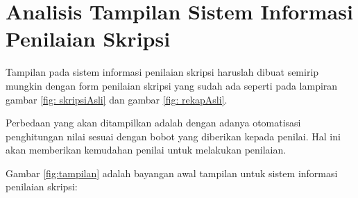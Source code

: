 \section{Analisis Tampilan Sistem Informasi Penilaian Skripsi}
\label{sec: analisisTampilan}
	
	Tampilan pada sistem informasi penilaian skripsi haruslah dibuat semirip mungkin dengan form penilaian skripsi yang sudah ada seperti pada lampiran gambar \ref{fig: skripsiAsli} dan gambar \ref{fig: rekapAsli}.
	
	Perbedaan yang akan ditampilkan adalah dengan adanya otomatisasi penghitungan nilai sesuai dengan bobot yang diberikan kepada penilai. Hal ini akan memberikan kemudahan penilai untuk melakukan penilaian.
	
	Gambar \ref{fig:tampilan} adalah bayangan awal tampilan untuk sistem informasi penilaian skripsi:

